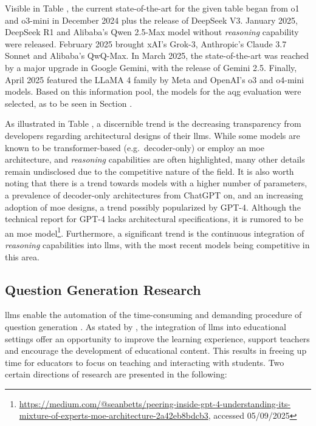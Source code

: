 Visible in Table , the current state-of-the-art for the given table began from o1 and o3-mini in December 2024 plus the release of DeepSeek V3. January 2025, DeepSeek R1 and Alibaba's Qwen 2.5-Max model without \textit{reasoning} capability were released. February 2025 brought xAI's Grok-3, Anthropic's Claude 3.7 Sonnet and Alibaba's QwQ-Max. In March 2025, the state-of-the-art was reached by a major upgrade in Google Gemini, with the release of Gemini 2.5. Finally, April 2025 featured the LLaMA 4 family by Meta and OpenAI's o3 and o4-mini models. Based on this information pool, the models for the \ac{aqg} evaluation were selected, as to be seen in Section . 

\pagebreak

 As illustrated in Table , a discernible trend is the decreasing transparency from developers regarding architectural designs of their \acp{llm}. While some models are known to be transformer-based (e.g.\ decoder-only) or employ an \ac{moe} architecture, and \textit{reasoning} capabilities are often highlighted, many other details remain undisclosed due to the competitive nature of the field. It is also worth noting that there is a trend towards models with a higher number of parameters, a prevalence of decoder-only architectures from ChatGPT on, and an increasing adoption of \ac{moe} designs, a trend possibly popularized by GPT-4. Although the technical report for GPT-4 \cite{openai_gpt-4_2024} lacks architectural specifications, it is rumored to be an \ac{moe} model\footnote{\url{https://medium.com/@seanbetts/peering-inside-gpt-4-understanding-its-mixture-of-experts-moe-architecture-2a42eb8bdcb3}, accessed 05/09/2025}. Furthermore, a significant trend is the continuous integration of \textit{reasoning} capabilities into \acp{llm}, with the most recent models being competitive in this area.

\subsection{Question Generation Research}
\label{sec:question-generation-research}

\acp{llm} enable the automation of the time-consuming and demanding procedure of question generation \cite{vu_chatgpt-based_2024}. As stated by \cite{naveed_comprehensive_2024}, the integration of \acp{llm} into educational settings offer an opportunity to improve the learning experience, support teachers and encourage the development of educational content. This results in freeing up time for educators to focus on teaching and interacting with students. Two certain directions of research are presented in the following:

